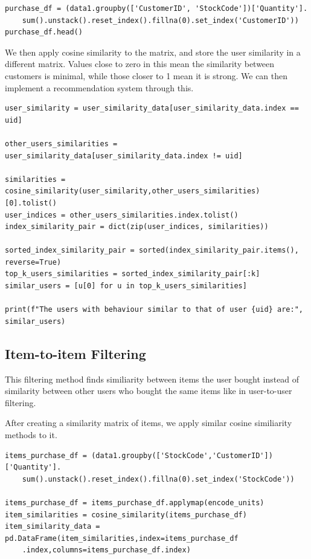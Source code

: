 \documentclass{article}
\begin{document}
\begin{lstlisting}
purchase_df = (data1.groupby(['CustomerID', 'StockCode'])['Quantity'].
    sum().unstack().reset_index().fillna(0).set_index('CustomerID'))
purchase_df.head()
\end{lstlisting}

We then apply cosine similarity to the matrix, and store the user similarity in a different matrix. Values close to zero in this mean the similarity between customers is minimal, while those closer to 1 mean it is strong. We can then implement a recommendation system through this.

\begin{lstlisting}
user_similarity = user_similarity_data[user_similarity_data.index == uid]

other_users_similarities = user_similarity_data[user_similarity_data.index != uid]

similarities = cosine_similarity(user_similarity,other_users_similarities)[0].tolist()
user_indices = other_users_similarities.index.tolist()
index_similarity_pair = dict(zip(user_indices, similarities))

sorted_index_similarity_pair = sorted(index_similarity_pair.items(), reverse=True)
top_k_users_similarities = sorted_index_similarity_pair[:k]
similar_users = [u[0] for u in top_k_users_similarities]

print(f"The users with behaviour similar to that of user {uid} are:", similar_users)
\end{lstlisting}

\subsection{Item-to-item Filtering}

This filtering method finds similiarity between items the user bought instead of similarity between other users who bought the same items like in user-to-user filtering.

\medskip

After creating a similarity matrix of items, we apply similar cosine similiarity methods to it.

\begin{lstlisting}
items_purchase_df = (data1.groupby(['StockCode','CustomerID'])['Quantity'].
    sum().unstack().reset_index().fillna(0).set_index('StockCode'))

items_purchase_df = items_purchase_df.applymap(encode_units)
item_similarities = cosine_similarity(items_purchase_df)
item_similarity_data = pd.DataFrame(item_similarities,index=items_purchase_df
    .index,columns=items_purchase_df.index)
\end{lstlisting}
\end{document}
